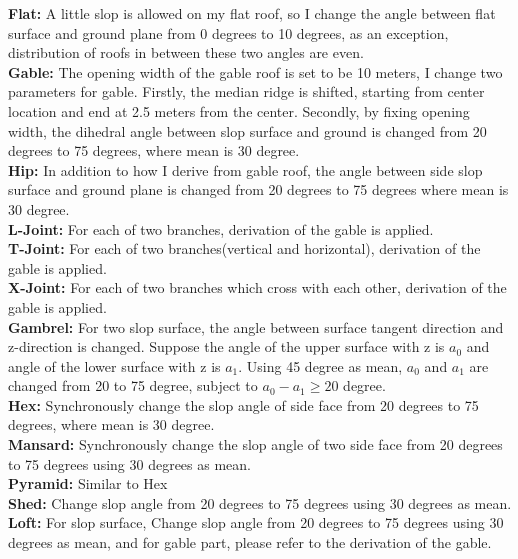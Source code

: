 \documentclass{iitthesis}
\begin{document}
{\noindent \textbf{Flat:}} A little slop is allowed on my flat roof, so I change the angle between flat surface and ground plane from 0 degrees to 10 degrees, as an exception, distribution of roofs in between these two angles are even.
\\ \textbf{Gable:} The opening width of the gable roof is set to be 10 meters, I change two parameters for gable. Firstly, the median ridge is shifted, starting from center location and end at 2.5 meters from the center. Secondly, by fixing opening width, the dihedral angle between slop surface and ground is changed from 20 degrees to 75 degrees, where mean is 30 degree.
\\ \textbf{Hip:} In addition to how I derive from gable roof, the angle between side slop surface and ground plane is changed from 20 degrees to 75 degrees where mean is 30 degree.
\\ \textbf{L-Joint:} For each of two branches, derivation of the gable is applied.
\\ \textbf{T-Joint:} For each of two branches(vertical and horizontal), derivation of the gable is applied.
\\ \textbf{X-Joint:} For each of two branches which cross with each other, derivation of the gable is applied.
\\ \textbf{Gambrel:} For two slop surface, the angle between surface tangent direction and z-direction is changed. Suppose the angle of the upper surface with z is $a_0$ and angle of the lower surface with z is $a_1$. Using 45 degree as mean, $a_0$ and $a_1$ are changed from 20 to 75 degree, subject to $a_0-a_1\geq 20$ degree.
\\ \textbf{Hex:} Synchronously change the slop angle of side face from 20 degrees to 75 degrees, where mean is 30 degree.
\\ \textbf{Mansard:} Synchronously change the slop angle of two side face from 20 degrees to 75 degrees using 30 degrees as mean.
\\ \textbf{Pyramid:} Similar to Hex
\\ \textbf{Shed:} Change slop angle from 20 degrees to 75 degrees using 30 degrees as mean.
\\ \textbf{Loft:} For slop surface, Change slop angle from 20 degrees to 75 degrees using 30 degrees as mean, and for gable part, please refer to the derivation of the gable.
\end{document}

